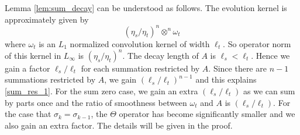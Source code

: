 \documentclass[10pt,reqno]{article}
\theoremstyle{plain} %
\theoremstyle{remark}
\numberwithin{equation}{section}
\begin{document}
Lemma \ref{lem:sum_decay} can be understood as follows. The evolution kernel is approximately given by 
\[
(\eta_s/\eta_t)^n  {\otimes^n}   \omega_{t}
\]
where $\omega_{t}$ is an $L_1$ normalized convolution kernel of width $\ell_t$. 
So operator norm of this kernel in $L_\infty$ is $(\eta_s/\eta_t)^n $.  The decay length of 
$A$ is $ \ell_s < \ell_t$. Hence we gain a factor $\ell_s/\ell_t$ for each summation restricted by $A$. Since there are $n-1$ summations restricted by $A$, we gain $ (\ell_s/\ell_t)^{n-1}$
and this explains \eqref{sum_res_1}. For the sum zero case, we gain an extra 
$(\ell_s/\ell_t)$ as we can sum by parts once  and the ratio of smoothness between $\omega_t$ and $A$ is $(\ell_s/\ell_t)$. For the case that  $\sigma_k=\sigma_{k-1}$, the $\Theta$ operator has become significantly smaller and we also gain  an extra factor. The details will be given in the proof. 
\end{document}
